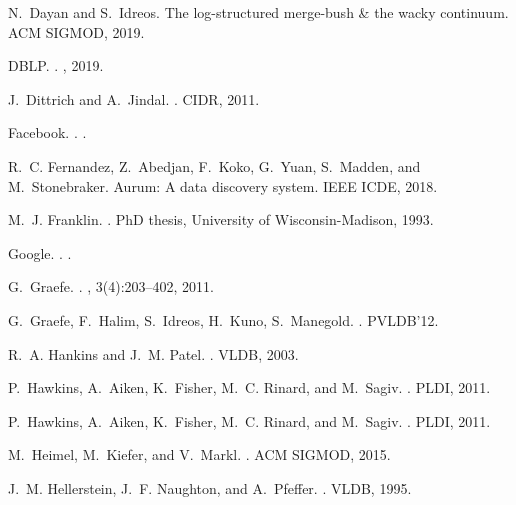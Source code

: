 \documentclass[11pt]{article}
\begin{document}
\begin{thebibliography}{10}
\begin{small}
N.~Dayan and S.~Idreos.
\newblock The log-structured merge-bush \& the wacky continuum.
\newblock ACM SIGMOD, 2019.

DBLP.
.
, 2019.

J.~Dittrich and A.~Jindal.
.
\newblock CIDR, 2011.

Facebook.
.
.

R.~C. Fernandez, Z.~Abedjan, F.~Koko, G.~Yuan, S.~Madden, and M.~Stonebraker.
\newblock Aurum: {A} data discovery system.
\newblock IEEE ICDE, 2018.

M.~J. Franklin.
.
\newblock PhD thesis, University of Wisconsin-Madison, 1993.

Google.
.
.

G.~Graefe.
.
, 3(4):203--402, 2011.

G.~Graefe, F.~Halim, S.~Idreos, H.~Kuno, S.~Manegold.
.
\newblock PVLDB'12.

R.~A. Hankins and J.~M. Patel.
.
\newblock VLDB, 2003.

P.~Hawkins, A.~Aiken, K.~Fisher, M.~C. Rinard, and M.~Sagiv.
.
\newblock PLDI, 2011.

P.~Hawkins, A.~Aiken, K.~Fisher, M.~C. Rinard, and M.~Sagiv.
.
\newblock PLDI, 2011.

M.~Heimel, M.~Kiefer, and V.~Markl.
.
\newblock ACM SIGMOD, 2015.

J.~M. Hellerstein, J.~F. Naughton, and A.~Pfeffer.
.
\newblock VLDB, 1995.


\end{small}
\end{thebibliography}
\end{document}
